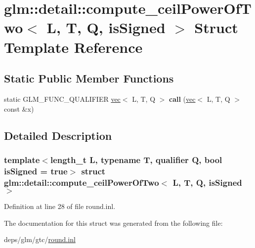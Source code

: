 \hypertarget{structglm_1_1detail_1_1compute__ceilPowerOfTwo}{}\section{glm\+:\+:detail\+:\+:compute\+\_\+ceil\+Power\+Of\+Two$<$ L, T, Q, is\+Signed $>$ Struct Template Reference}
\label{structglm_1_1detail_1_1compute__ceilPowerOfTwo}
\subsection*{Static Public Member Functions}
\begin{DoxyCompactItemize}
\item 
\mbox{\label{structglm_1_1detail_1_1compute__ceilPowerOfTwo_aa074d3ad43e792925268c9295c734054}} 
static G\+L\+M\+\_\+\+F\+U\+N\+C\+\_\+\+Q\+U\+A\+L\+I\+F\+I\+ER \hyperlink{structglm_1_1vec}{vec}$<$ L, T, Q $>$ {\bfseries call} (\hyperlink{structglm_1_1vec}{vec}$<$ L, T, Q $>$ const \&x)
\end{DoxyCompactItemize}


\subsection{Detailed Description}
\subsubsection*{template$<$length\+\_\+t L, typename T, qualifier Q, bool is\+Signed = true$>$\newline
struct glm\+::detail\+::compute\+\_\+ceil\+Power\+Of\+Two$<$ L, T, Q, is\+Signed $>$}



Definition at line 28 of file round.\+inl.



The documentation for this struct was generated from the following file\+:\begin{DoxyCompactItemize}
\item 
deps/glm/gtc/\hyperlink{round_8inl}{round.\+inl}\end{DoxyCompactItemize}
